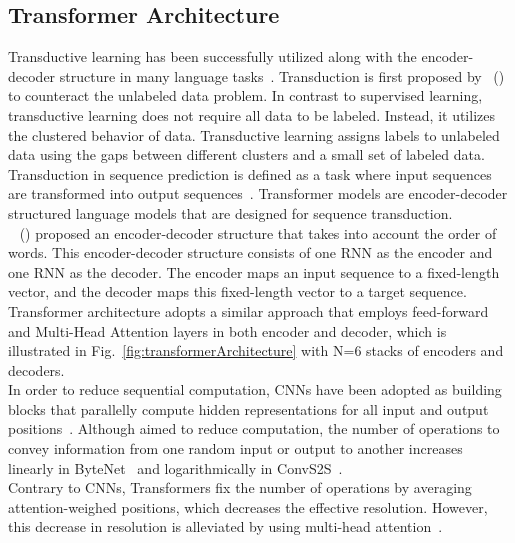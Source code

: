 \subsection{Transformer Architecture}
\label{subsec:newsContentModels_TransformerArch}
Transductive learning has been successfully utilized along with the encoder-decoder structure in many language
tasks~\parencite{S2SLearningWithNNs_Sutskever, LearningPhraseRepresentations_Cho, AttentionIsAllYouNeed_Vaswani}. Transduction is first proposed by~\citeauthor{LearningByTransduction_Gammerman} (\citeyear{LearningByTransduction_Gammerman}) to counteract the unlabeled data problem. In contrast to supervised learning, transductive learning does not require all data to be labeled. Instead, it utilizes the clustered behavior of data. Transductive learning assigns labels to unlabeled data using the gaps between different clusters and a small set of labeled data. Transduction in sequence prediction is defined as a task where input sequences are transformed into output sequences~\parencite{SequenceTransdutionWithRNNs_Graves}. Transformer models are encoder-decoder structured language models that are designed for sequence transduction.\\
~\citeauthor{LearningPhraseRepresentations_Cho} (\citeyear{LearningPhraseRepresentations_Cho}) proposed an encoder-decoder structure that takes into account the order of words. This encoder-decoder structure consists of one RNN as the encoder and one RNN as the decoder. The encoder maps an input sequence to a fixed-length vector, and the decoder maps this fixed-length vector to a target sequence. Transformer architecture adopts a similar approach that employs feed-forward and Multi-Head Attention layers in both encoder and decoder, which is illustrated in Fig.~\ref{fig:transformerArchitecture} with N=6 stacks of encoders and decoders.\\
In order to reduce sequential computation, CNNs have been adopted as building blocks that parallelly compute hidden representations for all input and output positions~\parencite{AttentionIsAllYouNeed_Vaswani}. Although aimed to reduce computation, the number of operations to convey information from one random input or output to another increases linearly in ByteNet~\parencite{ByteNet_Kalchbrenner} and logarithmically in ConvS2S~\parencite{ConvS2S_Gehring}.\\
Contrary to CNNs, Transformers fix the number of operations by averaging attention-weighed positions, which decreases the effective resolution. However, this decrease in resolution is alleviated by using multi-head attention~\parencite{AttentionIsAllYouNeed_Vaswani}.
